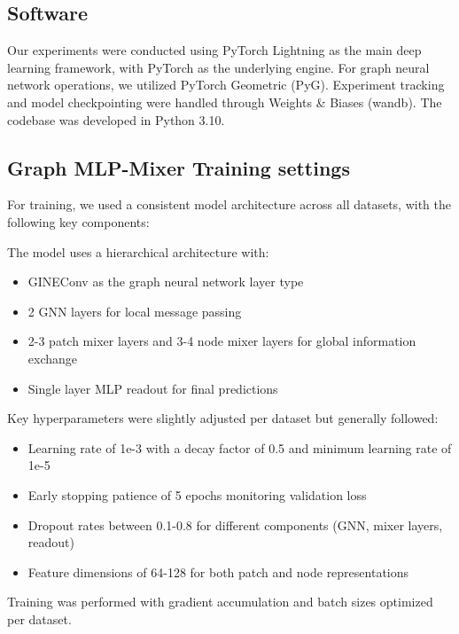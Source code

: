 \documentclass{article}
\theoremstyle{plain}
\theoremstyle{definition}
\theoremstyle{remark}
\begin{document}
\subsection{Software}
Our experiments were conducted using PyTorch Lightning as the main deep learning framework, with PyTorch as the underlying engine. For graph neural network operations, we utilized PyTorch Geometric (PyG). Experiment tracking and model checkpointing were handled through Weights \& Biases (wandb). The codebase was developed in Python 3.10.

\subsection{Graph MLP-Mixer Training settings}
For training, we used a consistent model architecture across all datasets, with the following key components:

The model uses a hierarchical architecture with:
\begin{itemize}
    \item GINEConv \cite{hu2019strategies} as the graph neural network layer type
    \item 2 GNN layers for local message passing
    \item 2-3 patch mixer layers and 3-4 node mixer layers for global information exchange
    \item Single layer MLP readout for final predictions
\end{itemize}

Key hyperparameters were slightly adjusted per dataset but generally followed:
\begin{itemize}
    \item Learning rate of 1e-3 with a decay factor of 0.5 and minimum learning rate of 1e-5
    \item Early stopping patience of 5 epochs monitoring validation loss
    \item Dropout rates between 0.1-0.8 for different components (GNN, mixer layers, readout)
    \item Feature dimensions of 64-128 for both patch and node representations
\end{itemize}

Training was performed with gradient accumulation and batch sizes optimized per dataset.
\end{document}
